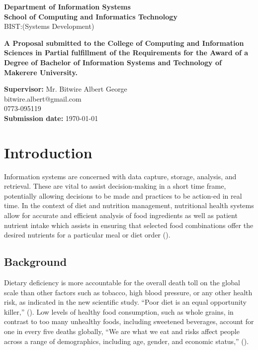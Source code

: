 \documentclass{article}
\begin{document}
\begin{center}
\begin{center}
\textbf{Department of Information Systems}\\
\textbf{School of Computing and Informatics Technology}
\\ BIST:(Systems Development)
\end{center}

\begin{center}
\textbf{A Proposal submitted to the College of Computing and Information Sciences in Partial fulfillment of the Requirements for the Award of a Degree of Bachelor of Information Systems and Technology of Makerere University.}
\end{center}

\vspace{3pt} 
\textbf{Supervisor:} Mr. Bitwire Albert George \\
 bitwire.albert@gmail.com \\ 0773-095119 \\
\textbf{Submission date:} \today

\end{center}

\newpage
\tableofcontents
\newpage

\section{Introduction}
\label{Introducion}
Information systems are concerned with data capture, storage, analysis, and retrieval. These are vital to assist decision-making in a short time frame, potentially allowing decisions to be made and practices to be action-ed in real time.  In the context of diet and nutrition management, nutritional health systems allow for accurate and efficient analysis of food ingredients as well as patient nutrient intake which assists in ensuring that selected food combinations offer the desired nutrients for a particular meal or diet order (\cite{DFM}). 


\subsection{Background}
\label{Background}
Dietary deficiency is more accountable for the overall death toll on the global scale than other factors such as tobacco, high blood pressure, or any other health risk, as indicated in the new scientific study. “Poor diet is an equal opportunity killer,” (\cite{ihme2019new}). Low levels of healthy food consumption, such as whole grains, in contrast to too many unhealthy foods, including sweetened beverages, account for one in every five deaths globally, “We are what we eat and risks affect people across a range of demographics, including age, gender, and economic status,” (\cite{ihme2019new}).
\end{document}
